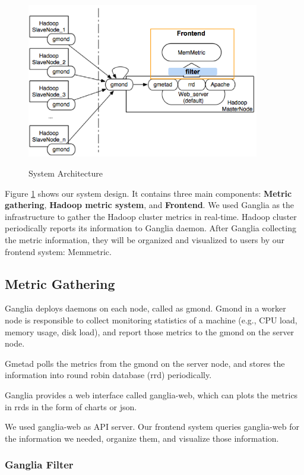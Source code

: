 \begin{figure}[ht]
  \centering
    \includegraphics[width=4.0in]{image/architecture.png}
    \label{ref-architecture}
    \caption{System Architecture}
\end{figure}

Figure \ref{ref-architecture} shows our system design. It contains three main components: \textbf{Metric gathering}, \textbf{Hadoop metric system}, and \textbf{Frontend}. We used Ganglia as the infrastructure to gather the  Hadoop cluster metrics in real-time. Hadoop cluster periodically reports its information to Ganglia daemon. After Ganglia collecting the metric information, they will be organized and visualized to users by our frontend system: Memmetric.

\subsection{Metric Gathering}

Ganglia deploys daemons on each node, called as gmond. Gmond in a worker node is responsible to collect monitoring statistics of a machine (e.g., CPU load, memory usage, disk load), and report those metrics to the gmond on the server node. 

Gmetad polls the metrics from the gmond on the server node, and stores the information into round robin database (rrd) periodically. 

Ganglia provides a web interface called ganglia-web, which can plots the metrics in rrds in the form of charts or json. 

We used ganglia-web as API server. Our frontend system queries ganglia-web for the information we needed, organize them, and visualize those information. 

\subsubsection{Ganglia Filter}

